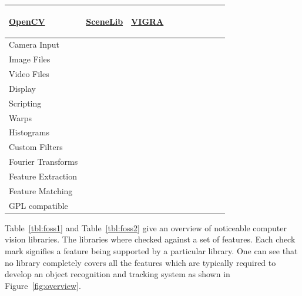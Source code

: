 \documentclass[12pt,a4paper,oneside,openright]{book}
\newcommand{\fig}[1]{Figure~\ref{fig:#1}}
\newcommand{\tbl}[1]{Table~\ref{tbl:#1}}
\newcommand{\tick}{\ding{52}} %
\newcommand{\xxxx}{}
\begin{document}
\begin{CJK}{UTF8}{}
\begin{table}[htbp]
\begin{center}
\begin{tabular}{l|ccccccccc}
      \begin{sideways}\href{http://opencv.willowgarage.com/}{\textbf{OpenCV}}\end{sideways} &
      \begin{sideways}\href{http://www.doc.ic.ac.uk/~ajd/software.html}{\textbf{SceneLib}}\end{sideways} &
      \begin{sideways}\href{http://kogs-www.informatik.uni-hamburg.de/~koethe/vigra/}{\textbf{VIGRA}}\end{sideways}\\\midrule
      Camera Input         & \xxxx & \tick & \tick & \tick & \tick & \xxxx & \tick & \tick & \xxxx \\
      Image Files          & \tick & \tick & \tick & \tick & \tick & \tick & \tick & \xxxx & \tick \\
      Video Files          & \xxxx & \tick & \xxxx & \xxxx & \tick & \xxxx & \tick & \xxxx & \xxxx \\
      Display              & \tick & \tick & \tick & \tick & \tick & \xxxx & \tick & \tick & \xxxx \\
      Scripting            & \xxxx & \xxxx & \xxxx & \tick & \xxxx & \xxxx & \tick & \xxxx & \xxxx \\
      Warps                & \tick & \xxxx & \xxxx & \tick & \tick & \tick & \tick & \xxxx & \xxxx \\
      Histograms           & \tick & \tick & \tick & \tick & \xxxx & \xxxx & \tick & \xxxx & \xxxx \\
      Custom Filters       & \tick & \tick & \tick & \tick & \tick & \tick & \xxxx & \xxxx & \tick \\
      Fourier Transforms   & \tick & \xxxx & \xxxx & \xxxx & \tick & \xxxx & \tick & \xxxx & \tick \\
      Feature Extraction   & \tick & \tick & \tick & \tick & \tick & \xxxx & \tick & \tick & \tick \\
      Feature Matching     & \xxxx & \tick & \tick & \xxxx & \xxxx & \xxxx & \tick & \tick & \xxxx \\
      \acs{GPL} compatible & \tick & \tick & \tick & \tick & \tick & \xxxx & \tick & \tick & \tick \\\bottomrule
    \end{tabular}
  \end{center}
\end{table}
\tbl{foss1} and \tbl{foss2} give an overview of noticeable computer vision libraries. The libraries where checked against a set of features. Each check mark signifies a feature being supported by a particular library. One can see that no library completely covers all the features which are typically required to develop an object recognition and tracking system as shown in \fig{overview}.


\end{CJK}
\end{document}
